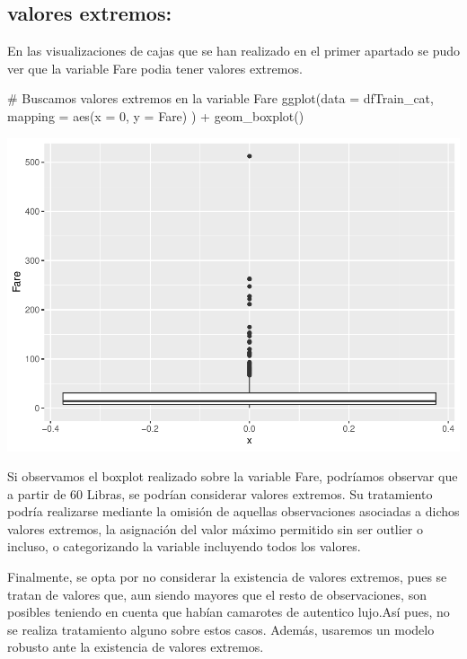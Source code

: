 \documentclass[
]{article}
\newenvironment{Shaded}{\begin{snugshade}}{\end{snugshade}}
\newcommand{\CommentTok}[1]{\textcolor[rgb]{0.50,0.62,0.50}{#1}}
\newcommand{\DataTypeTok}[1]{\textcolor[rgb]{0.87,0.87,0.75}{#1}}
\newcommand{\DecValTok}[1]{\textcolor[rgb]{0.86,0.86,0.80}{#1}}
\newcommand{\KeywordTok}[1]{\textcolor[rgb]{0.94,0.87,0.69}{#1}}
\newcommand{\NormalTok}[1]{\textcolor[rgb]{0.80,0.80,0.80}{#1}}
\newcommand{\OperatorTok}[1]{\textcolor[rgb]{0.94,0.94,0.82}{#1}}
\newcommand{\StringTok}[1]{\textcolor[rgb]{0.80,0.58,0.58}{#1}}
\begin{document}
\hypertarget{valores-extremos}{%
\subsection{valores extremos:}\label{valores-extremos}}

En las visualizaciones de cajas que se han realizado en el primer
apartado se pudo ver que la variable Fare podia tener valores extremos.

\begin{Shaded}
\begin{Highlighting}[]
\CommentTok{# Buscamos valores extremos en la variable Fare }
\KeywordTok{ggplot}\NormalTok{(}\DataTypeTok{data =}\NormalTok{ dfTrain_cat,}
       \DataTypeTok{mapping =} \KeywordTok{aes}\NormalTok{(}\DataTypeTok{x =} \DecValTok{0}\NormalTok{,}
                     \DataTypeTok{y =}\NormalTok{ Fare)}
\NormalTok{       ) }\OperatorTok{+}
\StringTok{  }\KeywordTok{geom_boxplot}\NormalTok{()}
\end{Highlighting}
\end{Shaded}

\includegraphics{m2851_PRA2_aruizplaza_rcotillas_files/figure-latex/unnamed-chunk-27-1.pdf}

Si observamos el boxplot realizado sobre la variable Fare, podríamos
observar que a partir de 60 Libras, se podrían considerar valores
extremos. Su tratamiento podría realizarse mediante la omisión de
aquellas observaciones asociadas a dichos valores extremos, la
asignación del valor máximo permitido sin ser outlier o incluso, o
categorizando la variable incluyendo todos los valores.

Finalmente, se opta por no considerar la existencia de valores extremos,
pues se tratan de valores que, aun siendo mayores que el resto de
observaciones, son posibles teniendo en cuenta que habían camarotes de
autentico lujo.Así pues, no se realiza tratamiento alguno sobre estos
casos. Además, usaremos un modelo robusto ante la existencia de valores
extremos.
\end{document}
